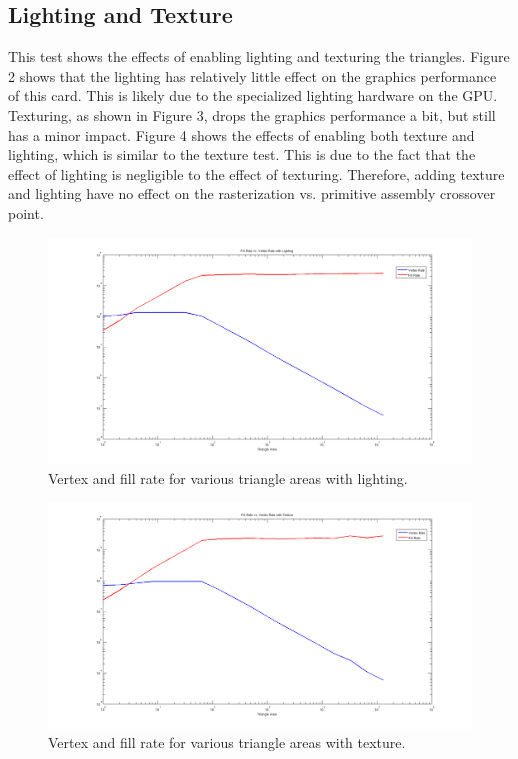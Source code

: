 \documentclass[12pt] {article}
\begin{document}
\newpage
\subsection{Lighting and Texture}
This test shows the effects of enabling lighting and texturing the triangles. Figure 2 shows that the lighting has relatively little effect on the graphics performance of this card. This is likely due to the specialized lighting hardware on the GPU. Texturing, as shown in Figure 3, drops the graphics performance a bit, but still has a minor impact. Figure 4 shows the effects of enabling both texture and lighting, which is similar to the texture test. This is due to the fact that the effect of lighting is negligible to the effect of texturing. Therefore, adding texture and lighting have no effect on the rasterization vs. primitive assembly crossover point.
\begin{figure}[ht!]
	\centering
	\includegraphics[width=5in]{figures/results2-lighting.png}
	\caption{Vertex and fill rate for various triangle areas with lighting.}
\end{figure}
\FloatBarrier

\begin{figure}[ht!]
	\centering
	\includegraphics[width=5in]{figures/results2-texture.png}
	\caption{Vertex and fill rate for various triangle areas with texture.}
\end{figure}
\FloatBarrier
\end{document}
